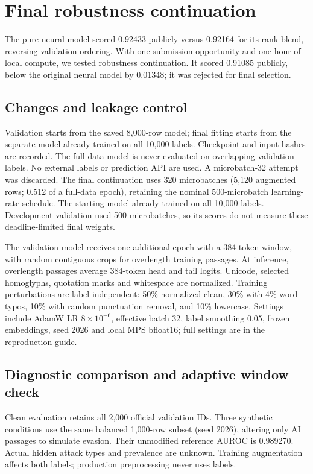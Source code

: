 \newpage
\begingroup\small\setlength{\emergencystretch}{2em}
\section*{Final robustness continuation}
The pure neural model scored 0.92433 publicly versus 0.92164 for its rank blend, reversing validation ordering. With one submission opportunity and one hour of local compute, we tested robustness continuation. It scored 0.91085 publicly, below the original neural model by 0.01348; it was rejected for final selection.

\subsection*{Changes and leakage control}
Validation starts from the saved 8,000-row model; final fitting starts from the separate model already trained on all 10,000 labels. Checkpoint and input hashes are recorded. The full-data model is never evaluated on overlapping validation labels. No external labels or prediction API are used. A microbatch-32 attempt was discarded. The final continuation uses 320 microbatches (5,120 augmented rows; 0.512 of a full-data epoch), retaining the nominal 500-microbatch learning-rate schedule. The starting model already trained on all 10,000 labels. Development validation used 500 microbatches, so its scores do not measure these deadline-limited final weights.

The validation model receives one additional epoch with a 384-token window, with random contiguous crops for overlength training passages. At inference, overlength passages average 384-token head and tail logits. Unicode, selected homoglyphs, quotation marks and whitespace are normalized. Training perturbations are label-independent: 50\% normalized clean, 30\% with 4\%-word typos, 10\% with random punctuation removal, and 10\% lowercase. Settings include AdamW LR $8\times10^{-6}$, effective batch 32, label smoothing 0.05, frozen embeddings, seed 2026 and local MPS bfloat16; full settings are in the reproduction guide.

\subsection*{Diagnostic comparison and adaptive window check}
Clean evaluation retains all 2,000 official validation IDs. Three synthetic conditions use the same balanced 1,000-row subset (seed 2026), altering only AI passages to simulate evasion. Their unmodified reference AUROC is 0.989270. Actual hidden attack types and prevalence are unknown. Training augmentation affects both labels; production preprocessing never uses labels.


